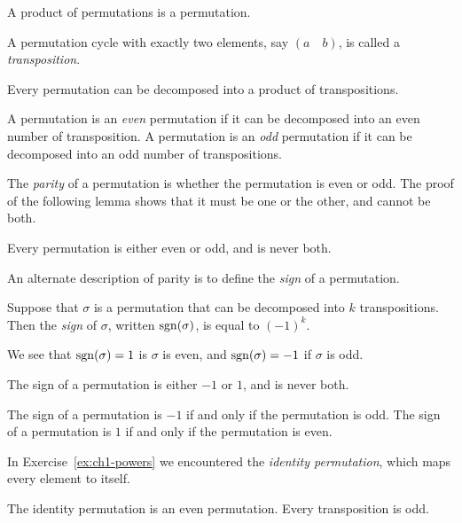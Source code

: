 \begin{lemma}
    A product of permutations is a permutation.
\end{lemma}

\begin{definition}[(Transposition)]
    A permutation cycle with exactly two elements, say \((a\quad b)\), is called a \textit{transposition}.
\end{definition}

\begin{lemma}
    Every permutation can be decomposed into a product of transpositions.
\end{lemma}

\begin{definition}
    A permutation is an \textit{even} permutation if it can be decomposed into an even number of transposition. A permutation is an \textit{odd} permutation if it can be decomposed into an odd number of transpositions.
\end{definition}

The \textit{parity} of a permutation is whether the permutation is even or odd. The proof of the following lemma shows that it must be one or the other, and cannot be both.

\begin{lemma}
    Every permutation is either even or odd, and is never both.
\end{lemma}

An alternate description of parity is to define the \textit{sign} of a permutation.

\begin{definition}
    Suppose that \(\sigma\) is a permutation that can be decomposed into \(k\) transpositions. Then the \textit{sign} of \(\sigma\), written \(\mathrm{sgn}(\sigma)\), is equal to \((-1)^{k}\).
\end{definition}

We see that \(\mathrm{sgn}(\sigma) = 1\) is \(\sigma\) is even, and \(\mathrm{sgn}(\sigma) = -1\) if \(\sigma\) is odd.

\begin{lemma}
    The sign of a permutation is either \(-1\) or \(1\), and is never both.
\end{lemma}

\begin{lemma}
    The sign of a permutation is \(-1\) if and only if the permutation is odd. The sign of a permutation is \(1\) if and only if the permutation is even.
\end{lemma}

In Exercise~\ref{ex:ch1-powers} we encountered the \textit{identity permutation}, which maps every element to itself.

\begin{lemma}
    The identity permutation is an even permutation. Every transposition is odd.
\end{lemma}